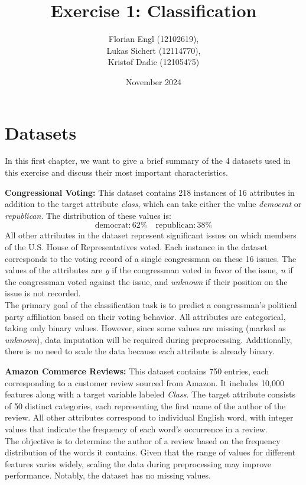 \documentclass[a4paper,10pt]{article}
\title{Exercise 1: Classification}
\author{Florian Engl (12102619),\\ Lukas Sichert (12114770),\\ Kristof Dadic (12105475)}
\date{November 2024}
\begin{document}
\maketitle

\tableofcontents


\section{Datasets}

In this first chapter, we want to give a brief summary of the 4 datasets used in this exercise and discuss their most important characteristics.

\textbf{Congressional Voting:} This dataset contains 218 instances of 16 attributes in addition to the target attribute \emph{class}, which can take either the value \emph{democrat} or \emph{republican}. The distribution of these values is:
\begin{equation*}
    \text{democrat:}\,62\% \quad \text{republican:}\,38\%
\end{equation*}
All other attributes in the dataset represent significant issues on which members of the U.S. House of Representatives voted. Each instance in the dataset corresponds to the voting record of a single congressman on these 16 issues. The values of the attributes are \emph{y} if the congressman voted in favor of the issue, \emph{n} if the congressman voted against the issue, and \emph{unknown} if their position on the issue is not recorded. \\
The primary goal of the classification task is to predict a congressman’s political party affiliation based on their voting behavior. All attributes are categorical, taking only binary values. However, since some values are missing (marked as \emph{unknown}), data imputation will be required during preprocessing. Additionally, there is no need to scale the data because each attribute is already binary.

\textbf{Amazon Commerce Reviews:} This dataset contains 750 entries, each corresponding to a customer review sourced from Amazon. It includes 10,000 features along with a target variable labeled \emph{Class}. The target attribute consists of 50 distinct categories, each representing the first name of the author of the review. All other attributes correspond to individual English word, with integer values that indicate the frequency of each word’s occurrence in a review. \\
The objective is to determine the author of a review based on the frequency distribution of the words it contains. Given that the range of values for different features varies widely, scaling the data during preprocessing may improve performance. Notably, the dataset has no missing values.
\end{document}
